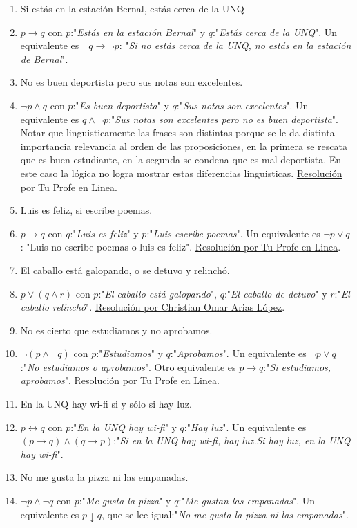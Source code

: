 \documentclass[a4paper]{article}
\newcommand{\Item}{\item[\stepcounter{enumii}$\blacktriangleright$\textbf{(\alph{enumii})}]} %
\newcommand{\answer}{\item[**]}
\newcommand{\then}{\to}
\newcommand{\eq}{\leftrightarrow}
\begin{document}
\begin{enumerate}
\begin{multicols}{2}
\begin{enumerate} [label=(\alph*)]
		\item Si estás en la estación Bernal, estás cerca de la UNQ 
		\answer $p\then q$ con $p$:"\textit{Estás en la estación Bernal}" y $q$:"\textit{Estás cerca de la UNQ}". Un equivalente es $\neg q \then \neg p$: "\textit{Si no estás cerca de la UNQ, no estás en la estación de Bernal}".

		\Item No es buen deportista pero sus notas son excelentes.
		\answer $\neg p \land q$ con $p$:"\textit{Es buen deportista}" y $q$:"\textit{Sus notas son excelentes}". Un equivalente es $q \land \neg p$:"\textit{Sus notas son excelentes pero no es buen deportista}". Notar que linguisticamente las frases son distintas porque se le da distinta importancia relevancia al orden de las proposiciones, en la primera se rescata que es buen estudiante, en la segunda se condena que es mal deportista. En este caso la lógica no logra mostrar estas diferencias linguisticas. \href{https://youtu.be/HXzyX5XGPp8?t=503}{Resolución por Tu Profe en Linea}.

		\item Luis es feliz, si escribe poemas.
		\answer $p \then q$ con $q$:"\textit{Luis es feliz}" y $p$:"\textit{Luis escribe poemas}". Un equivalente es $\neg p \lor q$: "Luis no escribe poemas o luis es feliz". \href{https://youtu.be/HXzyX5XGPp8?t=374}{Resolución por Tu Profe en Linea}.

		\Item El caballo está galopando, o se detuvo y relinchó.
		\answer $p \lor (q \land r)$ con $p$:"\textit{El caballo está galopando}", $q$:"\textit{El caballo de detuvo}" y $r$:"\textit{El caballo relinchó}". \href{https://youtu.be/TgwraosKUuY?t=70}{Resolución por Christian Omar Arias López}.

		\item No es cierto que estudiamos y no aprobamos.
		\answer $\neg (p \land \neg q)$ con $p$:"\textit{Estudiamos}" y $q$:"\textit{Aprobamos}". Un equivalente es $\neg p \lor q$:"\textit{No estudiamos o aprobamos}". Otro equivalente es $p \then q$:"\textit{Si estudiamos, aprobamos}". \href{https://youtu.be/HXzyX5XGPp8}{Resolución por Tu Profe en Linea}.

		\item En la UNQ hay wi-fi si y sólo si hay luz.
		\answer $p\eq q$ con $p$:"\textit{En la UNQ hay wi-fi}" y $q$:"\textit{Hay luz}". Un equivalente es $(p \then q) \land (q \then p)$:"\textit{Si en la UNQ hay wi-fi, hay luz.Si hay luz, en la UNQ hay wi-fi}".

		\Item No me gusta la pizza ni las empanadas. 
		\answer $\neg p  \land  \neg q$ con $p$:"\textit{Me gusta la pizza}" y $q$:"\textit{Me gustan las empanadas}". Un equivalente es $p \downarrow  q$, que se lee igual:"\textit{No me gusta la pizza ni las empanadas}".


\end{enumerate}
\end{multicols}
\end{enumerate}
\end{document}
